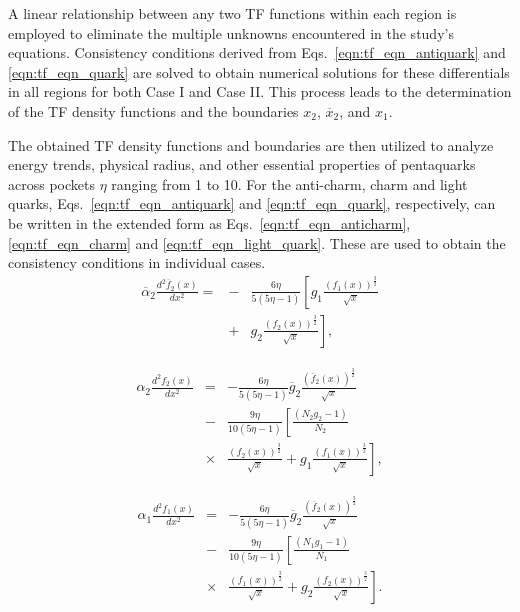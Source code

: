 \documentclass[final,3p,times,twocolumn]{elsarticle}
\begin{document}
        A linear relationship between any two TF functions within each region is employed to eliminate the multiple unknowns encountered in the study's equations. Consistency conditions derived from Eqs.~\eqref{eqn:tf_eqn_antiquark} and \eqref{eqn:tf_eqn_quark} are solved to obtain numerical solutions for these differentials in all regions for both Case I and Case II. This process leads to the determination of the TF density functions and the boundaries $x_2$, $\overline{x}_{2}$, and $x_1$. 
        
        The obtained TF density functions and boundaries are then utilized to analyze energy trends, physical radius, and other essential properties of pentaquarks across pockets $\eta$ ranging from 1 to 10.
        For the anti-charm, charm and light quarks, Eqs.~\eqref{eqn:tf_eqn_antiquark} and \eqref{eqn:tf_eqn_quark}, respectively, can be written in the extended form as Eqs.~\eqref{eqn:tf_eqn_anticharm}, \eqref{eqn:tf_eqn_charm} and \eqref{eqn:tf_eqn_light_quark}. These are used to obtain the consistency conditions in individual cases.
        \begin{eqnarray}
             \overline{\alpha}_2 \frac{d^2\overline{f}_{2}(x)}{dx^2}= &-&\frac{6\eta}{5(5\eta-1)} \left[ g_1 \frac{(f_1(x))^\frac{3}{2}}{\sqrt{x}} \right. \nonumber \\
             &+& \left. g_2 \frac{(f_2(x))^\frac{3}{2}}{\sqrt{x}} \right],
             \label{eqn:tf_eqn_anticharm}
        \end{eqnarray}
        
        \begin{eqnarray}
            \alpha_2 \frac{d^2 f_2(x)}{dx^2} &=&-\frac{6\eta}{5(5\eta-1)}    \overline{g}_{2} \frac{\left( \overline{f}_{2}(x) \right)^\frac{3}{2}}{\sqrt{x}} \nonumber \\ 
            &-& \frac{9\eta}{10(5\eta-1)}\left[\frac{(N_2 g_2-1)}{N_2} \right. \nonumber \\ 
            &\times& \frac{\left( f_2(x) \right)^\frac{3}{2}}{\sqrt{x}}
            + \left. g_1 \frac{\left( f_1(x) \right)^\frac{3}{2}}{\sqrt{x}} \right],
            \label{eqn:tf_eqn_charm}
        \end{eqnarray}
        
        \begin{eqnarray}
            \alpha_1 \frac{d^2 f_1(x)}{dx^2} &=& -\frac{6 \eta}{5(5 \eta -1)}\overline{g}_{2} \frac{(\overline{f}_{2}(x))^\frac{3}{2}}{\sqrt{x}} \nonumber \\
            &-&\frac{9\eta}{10(5\eta-1)}\left[\frac{(N_1 g_1-1)}{N_1} \right. \nonumber \\ 
            &\times& \frac{\left( f_1(x) \right)^\frac{3}{2}}{\sqrt{x}}
            + \left. g_2 \frac{\left( f_2(x) \right)^\frac{3}{2}}{\sqrt{x}} \right].
            \label{eqn:tf_eqn_light_quark}
        \end{eqnarray}
        
\end{document}
